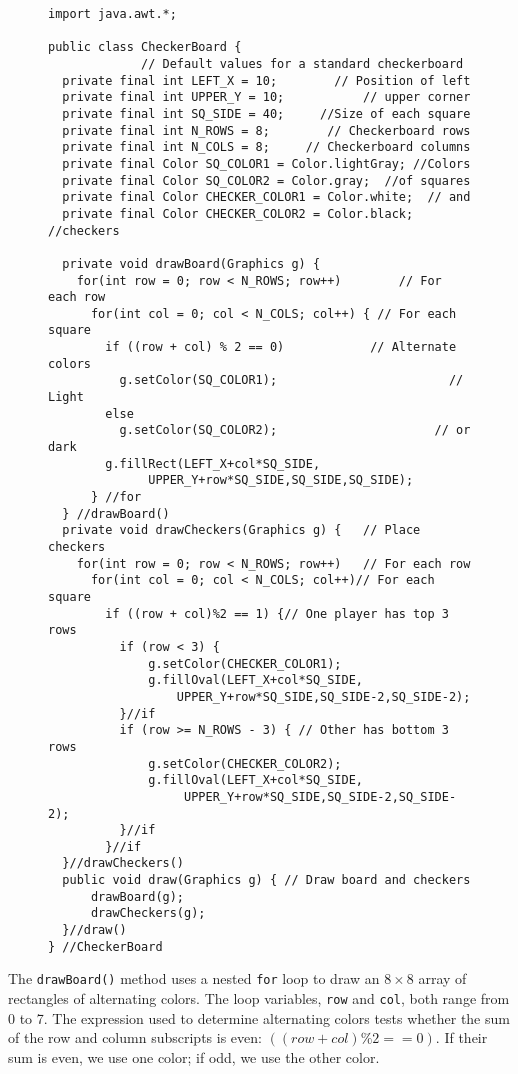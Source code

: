 \begin{figure}[h!]
\jjjprogstart
\begin{jjjlisting}[28pc]
\begin{lstlisting}
import java.awt.*;

public class CheckerBoard {
             // Default values for a standard checkerboard
  private final int LEFT_X = 10;        // Position of left
  private final int UPPER_Y = 10;           // upper corner
  private final int SQ_SIDE = 40;     //Size of each square
  private final int N_ROWS = 8;        // Checkerboard rows
  private final int N_COLS = 8;     // Checkerboard columns
  private final Color SQ_COLOR1 = Color.lightGray; //Colors
  private final Color SQ_COLOR2 = Color.gray;  //of squares
  private final Color CHECKER_COLOR1 = Color.white;  // and
  private final Color CHECKER_COLOR2 = Color.black; //checkers

  private void drawBoard(Graphics g) {
    for(int row = 0; row < N_ROWS; row++)        // For each row
      for(int col = 0; col < N_COLS; col++) { // For each square
        if ((row + col) % 2 == 0)            // Alternate colors
          g.setColor(SQ_COLOR1);                        // Light
        else
          g.setColor(SQ_COLOR2);                      // or dark
        g.fillRect(LEFT_X+col*SQ_SIDE,
              UPPER_Y+row*SQ_SIDE,SQ_SIDE,SQ_SIDE);
      } //for
  } //drawBoard()
  private void drawCheckers(Graphics g) {   // Place checkers
    for(int row = 0; row < N_ROWS; row++)   // For each row
      for(int col = 0; col < N_COLS; col++)// For each square
        if ((row + col)%2 == 1) {// One player has top 3 rows
          if (row < 3) {
              g.setColor(CHECKER_COLOR1);
              g.fillOval(LEFT_X+col*SQ_SIDE,
                  UPPER_Y+row*SQ_SIDE,SQ_SIDE-2,SQ_SIDE-2);
          }//if
          if (row >= N_ROWS - 3) { // Other has bottom 3 rows
              g.setColor(CHECKER_COLOR2);
              g.fillOval(LEFT_X+col*SQ_SIDE,
                   UPPER_Y+row*SQ_SIDE,SQ_SIDE-2,SQ_SIDE-2);
          }//if
        }//if
  }//drawCheckers()
  public void draw(Graphics g) { // Draw board and checkers
      drawBoard(g);
      drawCheckers(g);
  }//draw()
} //CheckerBoard
\end{lstlisting}
\end{jjjlisting}
\end{figure}

The {\tt drawBoard()} method uses a nested {\tt for} loop to draw an
$8 \times 8$ array of rectangles of alternating colors. The loop
variables, {\tt row} and {\tt col}, both range from 0 to 7.  The
expression used to determine alternating colors tests whether the sum
of the row and column subscripts is even: $((row + col) \% 2 == 0)$.
If their sum is even, we use one color; if odd, we use the other
color. 


